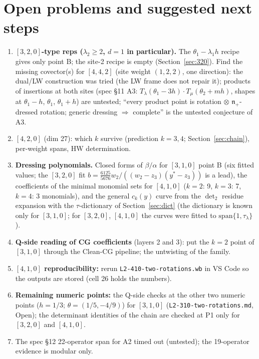 \documentclass[11pt]{article}
\newcommand{\nb}[1]{\texttt{#1}}
\begin{document}
\section{Open problems and suggested next steps}\label{sec:open}

\begin{enumerate}
\item \textbf{$[3,2,0]$-type reps ($\lambda_2\ge2$, $d=1$ in particular).} The $\theta_1-\lambda_1h$ recipe gives only point B; the site-2 recipe is empty (Section~\ref{sec:320}). Find the missing covector(s) for $[4,4,2]$ (site weight $(1,2,2)$, one direction): the dual/LW construction was tried (the LW frame does not repair it); products of insertions at both sites (spec \S11 A3: $T_\lambda(\theta_1-3h)\cdot T_\mu(\theta_2+mh)$, shapes at $\theta_1-h$, $\theta_1$, $\theta_1+h$) are untested; ``every product point is rotation $\otimes$ $\mathfrak n_+$-dressed rotation; generic dressing $\Rightarrow$ complete'' is the untested conjecture of A3.
\item \textbf{$[4,2,0]$} (dim 27): which $k$ survive (prediction $k=3,4$; Section~\ref{sec:chain}), per-weight spans, HW determination.
\item \textbf{Dressing polynomials.} Closed forms of $\beta/\alpha$ for $[3,1,0]$ point B (six fitted values; the $[3,2,0]$ fit $b=\frac{6125}{5676}w_2/((w_2-z_3)(y^*-z_3))$ is a lead), the coefficients of the minimal monomial sets for $[4,1,0]$ ($k=2$: 9, $k=3$: 7, $k=4$: 3 monomials), and the general $c_k(y)$ curve from the $\det_2$ residue expansion with the $\tau$-dictionary of Section~\ref{sec:dict} (the dictionary is known only for $[3,1,0]$; for $[3,2,0]$, $[4,1,0]$ the curves were fitted to $\mathrm{span}\{1,\tau_\lambda\}$).
\item \textbf{Q-side reading of CG coefficients} (layers 2 and 3): put the $k=2$ point of $[3,1,0]$ through the Clean-CG pipeline; the untwisting of the family.
\item \textbf{$[4,1,0]$ reproducibility:} rerun \nb{L2-410-two-rotations.wb} in VS Code so the outputs are stored (cell 26 holds the numbers).
\item \textbf{Remaining numeric points:} the Q-side checks at the other two numeric points ($h=1/3$; $\theta=(1/5,-4/9)$) for $[3,1,0]$ (\nb{L2-310-two-rotations.md}, Open); the determinant identities of the chain are checked at P1 only for $[3,2,0]$ and $[4,1,0]$.
\item The spec \S12 22-operator span for A2 timed out (untested); the 19-operator evidence is modular only.
\end{enumerate}
\end{document}
